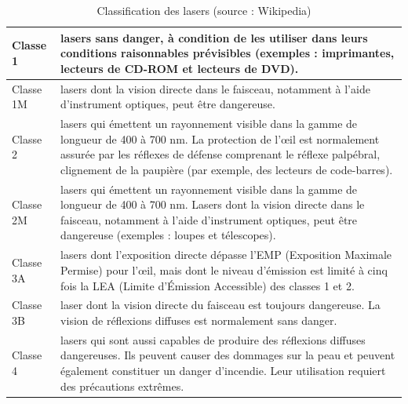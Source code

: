 \begin{appendices}
\begin{fr}
\begin{table}
\begin{bigcenter}
	\begin{tabular}{|l|p{}|}
\hline 
Classe 1 & lasers sans danger, à condition de les utiliser dans leurs conditions raisonnables prévisibles (exemples : imprimantes, lecteurs de CD-ROM et lecteurs de DVD). \\
\hline
Classe 1M & lasers dont la vision directe dans le faisceau, notamment à l’aide d’instrument optiques, peut être dangereuse. \\
\hline
Classe 2 & lasers qui émettent un rayonnement visible dans la gamme de longueur de 400 à 700 nm. La protection de l’œil est normalement assurée par les réflexes de défense comprenant le réflexe palpébral, clignement de la paupière (par exemple, des lecteurs de code-barres). \\
\hline
Classe 2M & lasers qui émettent un rayonnement visible dans la gamme de longueur de 400 à 700 nm. Lasers dont la vision directe dans le faisceau, notamment à l’aide d’instrument optiques, peut être dangereuse (exemples : loupes et télescopes). \\
\hline
Classe 3A & lasers dont l’exposition directe dépasse l’EMP (Exposition Maximale Permise) pour l’œil, mais dont le niveau d’émission est limité à cinq fois la LEA (Limite d’Émission Accessible) des classes 1 et 2. \\
\hline
Classe 3B & laser dont la vision directe du faisceau est toujours dangereuse. La vision de réflexions diffuses est normalement sans danger. \\
\hline
Classe 4 & lasers qui sont aussi capables de produire des réflexions diffuses dangereuses. Ils peuvent causer des dommages sur la peau et peuvent également constituer un danger d’incendie. Leur utilisation requiert des précautions extrêmes. \\
\hline

	\end{tabular}
	\end{bigcenter}
	\caption{\label{tab:laser_classification} Classification des lasers (source : Wikipedia)}
\end{table}	
\end{fr}


\end{appendices}
